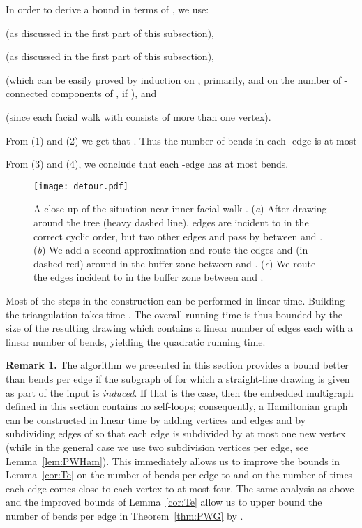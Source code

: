 \documentclass{llncs}
\newcommand{\remove}[1]{}
\begin{document}
In order to derive a bound in terms of , we use:

   (as discussed in the first part of this subsection),

  (as discussed in the first part of this subsection),

 


  (which can be easily proved by induction on , primarily, and on the number of -connected components of , if ), and




   (since each facial walk  with  consists of more than one vertex).
 

\remove{In order to derive a bound in terms of , we use   (as discussed in the first part of this subsection),  ,  ,   (since each facial walk  with  consists of more than one vertex), and   (as discussed in the first part of this subsection).
}

From (1) and (2) we get that .
Thus the number of bends in each -edge is at most

From (3) and (4), we conclude that each -edge has at most  bends.







\begin{figure}[tb]\centering
\texttt{[image: detour.pdf]}
\caption{A close-up of the situation near inner facial walk .
(\emph{a}) After drawing  around the tree  (heavy dashed line), edges
 are incident to  in the correct cyclic order, but two other edges  and   pass by between  and .
(\emph{b})  We add a second approximation  and route the edges  and  (in dashed red) around   in the buffer zone between  and .
(\emph{c})  We route the edges incident to  in the buffer zone between  and .}
\label{fig:route23}
\end{figure}

Most of the steps in the construction can be performed in linear time. Building the triangulation takes time . The overall running time is thus bounded by the size of the resulting drawing which contains a linear number of edges each with a linear number of bends, yielding the quadratic running time.

{\bf Remark 1.} The algorithm we presented in this section provides a bound better than  bends per edge if the subgraph  of  for which a straight-line drawing  is given as part of the input is {\em induced}. If that is the case, then the embedded multigraph  defined in this section contains no self-loops; consequently, a Hamiltonian graph  can be constructed in linear time by adding vertices and edges and by subdividing edges of  so that each edge is subdivided by at most one new vertex (while in the general case we use two subdivision vertices per edge, see Lemma~\ref{lem:PWHam}). This immediately allows us to improve the bounds in Lemma~\ref{cor:Te} on the number of bends per edge to  and on the number of times each edge comes close to each vertex  to at most four. The same analysis as above and the improved bounds of Lemma~\ref{cor:Te} allow us to upper bound the number of bends per edge in Theorem~\ref{thm:PWG} by .
\end{document}
